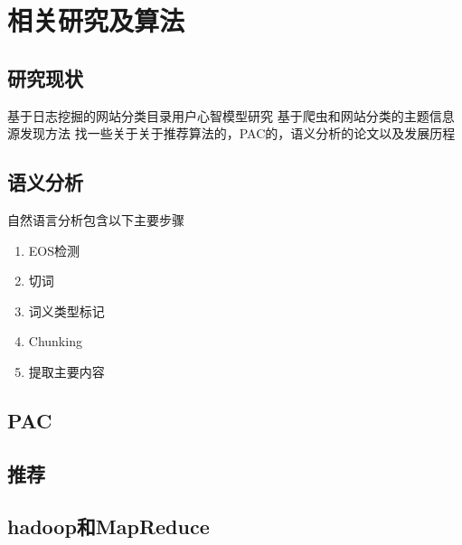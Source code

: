 \chapter{相关研究及算法}
\section{研究现状}
基于日志挖掘的网站分类目录用户心智模型研究
基于爬虫和网站分类的主题信息源发现方法
找一些关于关于推荐算法的，PAC的，语义分析的论文以及发展历程
\section{语义分析}
自然语言分析包含以下主要步骤
\begin{enumerate}
 \item EOS检测
 \item 切词
 \item 词义类型标记
 \item Chunking
 \item 提取主要内容
\end{enumerate}
\section{PAC}
\section{推荐}
\section{hadoop和MapReduce}